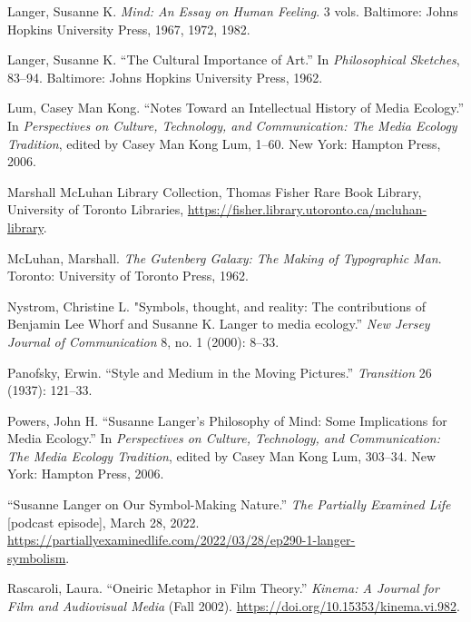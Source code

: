 \documentclass{tufte-handout}
\begin{document}
\begin{hangparas}{.25in}{1}
Langer, Susanne K. \emph{Mind: An Essay on Human Feeling}. 3 vols.
Baltimore: Johns Hopkins University Press, 1967, 1972, 1982.

Langer, Susanne K. ``The Cultural Importance of Art.'' In
\emph{Philosophical Sketches}, 83--94. Baltimore: Johns Hopkins
University Press, 1962.

Lum, Casey Man Kong. ``Notes Toward an Intellectual History of Media
Ecology.'' In \emph{Perspectives on Culture, Technology, and
Communication: The Media Ecology Tradition}, edited by Casey Man Kong
Lum, 1--60. New York: Hampton Press, 2006.

\enlargethispage{\baselineskip}

Marshall McLuhan Library Collection, Thomas Fisher Rare Book Library,
University of Toronto Libraries,
\url{https://fisher.library.utoronto.ca/mcluhan-library}.

McLuhan, Marshall. \emph{The Gutenberg Galaxy: The Making of Typographic
Man}. Toronto: University of Toronto Press, 1962.

Nystrom, Christine L. "Symbols, thought, and reality: The contributions
of Benjamin Lee Whorf and Susanne K. Langer to media ecology.''
\emph{New Jersey Journal of Communication} 8, no. 1 (2000): 8--33.

Panofsky, Erwin. ``Style and Medium in the Moving Pictures.''
\emph{Transition} 26 (1937): 121--33.

Powers, John H. ``Susanne Langer's Philosophy of Mind: Some Implications
for Media Ecology.'' In \emph{Perspectives on Culture, Technology, and
Communication: The Media Ecology Tradition}, edited by Casey Man Kong
Lum, 303--34. New York: Hampton Press, 2006.

``Susanne Langer on Our Symbol-Making Nature.'' \emph{The Partially
Examined Life} {[}podcast episode{]}, March 28, 2022.\\
\hspace{.25in}\href{https://partiallyexaminedlife.com/2022/03/28/ep290-1-langer-symbolism}{https://partiallyexaminedlife.com/2022/03/28/ep290-1-langer-}\\ \hspace{.25in}\href{https://partiallyexaminedlife.com/2022/03/28/ep290-1-langer-symbolism}{symbolism}.

Rascaroli, Laura. ``Oneiric Metaphor in Film Theory.'' \emph{Kinema: A
Journal for Film and Audiovisual Media} (Fall 2002).
\url{https://doi.org/10.15353/kinema.vi.982}.



\end{hangparas}
\end{document}
